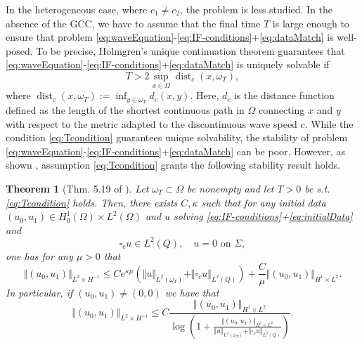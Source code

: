 \documentclass[sn-mathphys-num]{sn-jnl}
\newtheorem{thm}{Theorem}[section]
\numberwithin{equation}{section}
\newcommand{\wop}{\square_c}
\begin{document}
In the heterogeneous case, where $c_1 \not =  c_2$, the problem is less studied. In the absence of the GCC, we have to assume that the final time $T$ is large enough to ensure that problem \eqref{eq:waveEquation}-\eqref{eq:IF-conditions}+\eqref{eq:dataMatch} is well-posed. To be precise, Holmgren's unique continuation theorem guarantees that \eqref{eq:waveEquation}-\eqref{eq:IF-conditions}+\eqref{eq:dataMatch} is uniquely solvable if
\begin{equation}\label{eq:Tcondition}
    T > 2 \sup_{x \in \Omega} \operatorname{dist}_{c}(x,\omega_T),
\end{equation}
where $\operatorname{dist}_c(x,\omega_T) := \inf_{y \in \omega_T} d_c(x,y)$. Here, $d_c$ is the distance function defined as the length of the shortest continuous path in $\Omega$ connecting $x$ and $y$ with respect to the metric adapted to the discontinuous wave speed $c$. While the condition \eqref{eq:Tcondition} guarantees unique solvability, the stability of problem \eqref{eq:waveEquation}-\eqref{eq:IF-conditions}+\eqref{eq:dataMatch} can be poor. However, as shown \cite[Thm. 5.19]{Filippas22}, assumption \eqref{eq:Tcondition} grants the following stability result holds. 

\begin{thm}[Thm. 5.19 of \cite{Filippas22}]\label{thm:filippas}
    Let $\omega_T \subset \Omega$ be nonempty and let $T > 0$ be s.t. \eqref{eq:Tcondition} holds. Then, there exists $C,\kappa$ such that for any initial data $(u_0,u_1) \in H^1_0(\Omega) \times L^2(\Omega)$ and $u$ solving \eqref{eq:IF-conditions}+\eqref{eq:initialData} and  
\[
\wop u \in L^2(Q), \quad u = 0 \text{ on } \Sigma,
\]
one has for any $\mu > 0$ that 
    \begin{equation}\label{eq:FilippasEstimate}
        \Vert (u_0,u_1) \Vert_{L^2 \times H^{-1}} \le C e^{\kappa \mu} \left( \Vert u \Vert_{L^2(\omega_T)} + \Vert \wop u \Vert_{L^2(Q)} \right) + \frac{C}{\mu} \Vert (u_0,u_1) \Vert_{H^1 \times L^2}. 
    \end{equation}
    In particular, if $(u_0,u_1) \not = (0,0)$ we have that 
    \begin{equation}\label{eq:FilippasEstimateLog}
        \Vert (u_0,u_1) \Vert_{L^2 \times H^{-1}} \le C \frac{\Vert (u_0,u_1) \Vert_{H^1 \times L^2}}{\log \left( 1 + \frac{\Vert (u_0,u_1) \Vert_{H^1 \times L^2}}{ \Vert u \Vert_{L^2(\omega_T)} + \Vert \wop u \Vert_{L^2(Q)}} \right)}. 
    \end{equation} 
\end{thm} 
\end{document}
